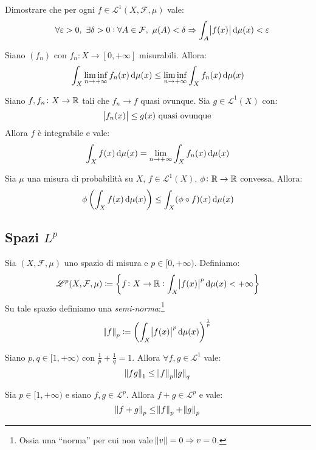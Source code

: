 \begin{exercise}
    Dimostrare che per ogni $ f \in \mathscr{L}^1(X,\mathcal{F},\mu) $ vale:
    \[ \quad \forall\epsilon > 0, \ \exists \delta > 0 : \forall A\in\mathcal{F}, \ \mu(A) < \delta \Rightarrow \int_A \abs{f(x)} \dif\mu(x) < \epsilon \]
\end{exercise}
\begin{exercise}
    Siano $ (f_n) $ con $ f_n\colon X\to[0,+\infty] $ misurabili. Allora:
    \[ \int_X \liminf_{n\to +\infty}f_n(x)\dif\mu(x) \leq \liminf_{n\to +\infty} \int_X f_n(x)\dif\mu(x) \]
\end{exercise}
\begin{exercise}
    Siano $ f, f_n\colon X\to\mathbb{R} $ tali che $ f_n\to f $ quasi ovunque. Sia $ g\in\mathscr{L}^1(X) $ con:
    \[ \abs{f_n(x)} \leq g(x) \text{ quasi ovunque} \]
    Allora $ f $ è integrabile e vale:
    \[ \int_X f(x)\dif\mu(x) = \lim_{n\to +\infty}\int_X f_n(x)\dif\mu(x) \]
\end{exercise}
\begin{exercise}
    Sia $ \mu $ una misura di probabilità su $ X $, $ f\in\mathscr{L}^1(X) $, $ \phi\colon \mathbb{R}\to\mathbb{R} $ convessa. Allora:
    \[ \phi\left(\int_X f(x)\dif\mu(x) \right) \leq \int_X (\phi\circ f)(x)\dif\mu(x) \]
\end{exercise}
\subsection{Spazi $ L^p $}
\begin{definition}
    Sia $ (X,\mathcal{F},\mu) $ uno spazio di misura e $ p\in[0,+\infty) $. Definiamo:
    \[ \mathscr{L}^p(X,\mathcal{F},\mu) \coloneqq \left\{ f\colon X\to \R : \int_X \abs{f(x)}^p \dif\mu(x) < +\infty \right\}  \]
    Su tale spazio definiamo una \emph{semi-norma}:\footnote{Ossia una ``norma'' per cui non vale $ \norm{v} = 0 \Rightarrow v=0 $.}
    \[ \norm{f}_p \coloneqq \left( \int_X \abs{f(x)}^p\dif\mu(x) \right)^{\frac{1}{p}} \]
\end{definition}
\begin{exercise}
    Siano $ p, q \in [1,+\infty) $ con $ \frac{1}{p} + \frac{1}{q} = 1 $. Allora $ \forall f,g \in \mathscr{L}^1 $ vale:
    \[ \norm{fg}_{1} \leq \norm{f}_p\norm{g}_q \]
\end{exercise}
\begin{exercise}
    Sia $ p\in[1,+\infty) $ e siano $ f,g \in\mathscr{L}^p$. Allora $ f+g \in\mathscr{L}^p $ e vale:
    \[ \norm{f+g}_p \leq \norm{f}_p + \norm{g}_p \]
\end{exercise}

